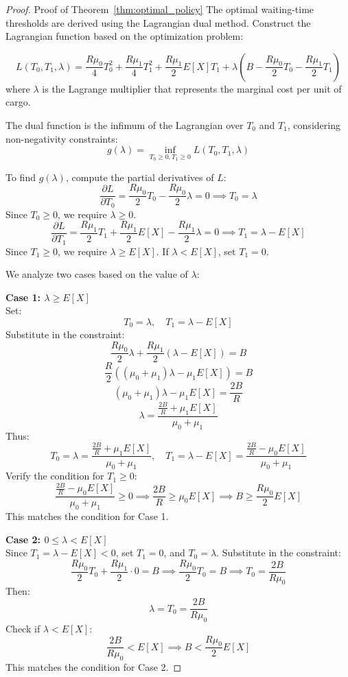 \documentclass[opre,sglanonrev]{informs4}
\begin{document}
\begin{proof}{Proof of Theorem~\ref{thm:optimal_policy}}
The optimal waiting-time thresholds are derived using the Lagrangian dual method. Construct the Lagrangian function based on the optimization problem:

\[
L(T_0, T_1, \lambda) = \frac{R \mu_0}{4} T_0^2 + \frac{R \mu_1}{4} T_1^2 + \frac{R \mu_1}{2} E[X] T_1 + \lambda \left( B - \frac{R \mu_0}{2} T_0 - \frac{R \mu_1}{2} T_1 \right)
\]
where \( \lambda \) is the Lagrange multiplier that represents the marginal cost per unit of cargo.

The dual function is the infimum of the Lagrangian over \( T_0 \) and \( T_1 \), considering non-negativity constraints:
\[
g(\lambda) = \inf_{T_0 \geq 0, T_1 \geq 0} L(T_0, T_1, \lambda)
\]

To find \( g(\lambda) \), compute the partial derivatives of \( L \):
\[
\frac{\partial L}{\partial T_0} = \frac{R \mu_0}{2} T_0 - \frac{R \mu_0}{2} \lambda = 0 \implies T_0 = \lambda
\]
Since \( T_0 \geq 0 \), we require \( \lambda \geq 0 \).
\[
\frac{\partial L}{\partial T_1} = \frac{R \mu_1}{2} T_1 + \frac{R \mu_1}{2} E[X] - \frac{R \mu_1}{2} \lambda = 0 \implies T_1 = \lambda - E[X]
\]
Since \( T_1 \geq 0 \), we require \( \lambda \geq E[X] \). If \( \lambda < E[X] \), set \( T_1 = 0 \).

We analyze two cases based on the value of \( \lambda \):

\textbf{Case 1: \( \lambda \geq E[X] \)} \\
Set:
\[
T_0 = \lambda, \quad T_1 = \lambda - E[X]
\]
Substitute in the constraint:
\[
\frac{R \mu_0}{2} \lambda + \frac{R \mu_1}{2} (\lambda - E[X]) = B
\]
\[
\frac{R}{2} \left( (\mu_0 + \mu_1) \lambda - \mu_1 E[X] \right) = B
\]
\[
(\mu_0 + \mu_1) \lambda - \mu_1 E[X] = \frac{2B}{R}
\]
\[
\lambda = \frac{\frac{2B}{R} + \mu_1 E[X]}{\mu_0 + \mu_1}
\]
Thus:
\[
T_0 = \lambda = \frac{\frac{2B}{R} + \mu_1 E[X]}{\mu_0 + \mu_1}, \quad T_1 = \lambda - E[X] = \frac{\frac{2B}{R} - \mu_0 E[X]}{\mu_0 + \mu_1}
\]
Verify the condition for \( T_1 \geq 0 \):
\[
\frac{\frac{2B}{R} - \mu_0 E[X]}{\mu_0 + \mu_1} \geq 0 \implies \frac{2B}{R} \geq \mu_0 E[X] \implies B \geq \frac{R \mu_0}{2} E[X]
\]
This matches the condition for Case 1.

\textbf{Case 2: \( 0 \leq \lambda < E[X] \)} \\
Since \( T_1 = \lambda - E[X] < 0 \), set \( T_1 = 0 \), and \( T_0 = \lambda \). Substitute in the constraint:
\[
\frac{R \mu_0}{2} T_0 + \frac{R \mu_1}{2} \cdot 0 = B \implies \frac{R \mu_0}{2} T_0 = B \implies T_0 = \frac{2B}{R \mu_0}
\]
Then:
\[
\lambda = T_0 = \frac{2B}{R \mu_0}
\]
Check if \( \lambda < E[X] \):
\[
\frac{2B}{R \mu_0} < E[X] \implies B < \frac{R \mu_0}{2} E[X]
\]
This matches the condition for Case 2.


\end{proof}
\end{document}
